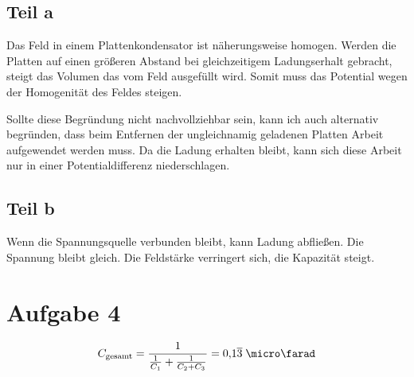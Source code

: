 \documentclass[a4paper,german,12pt,smallheadings]{scrartcl}
\begin{document}
\subsection*{Teil a}
Das Feld in einem Plattenkondensator ist näherungsweise homogen. Werden die
Platten auf einen größeren Abstand bei gleichzeitigem Ladungserhalt gebracht,
steigt das Volumen das vom Feld ausgefüllt wird. Somit muss das Potential wegen
der Homogenität des Feldes steigen.

Sollte diese Begründung nicht nachvollziehbar sein, kann ich auch alternativ
begründen, dass beim Entfernen der ungleichnamig geladenen Platten Arbeit
aufgewendet werden muss. Da die Ladung erhalten bleibt, kann sich diese Arbeit
nur in einer Potentialdifferenz niederschlagen.

\subsection*{Teil b}
Wenn die Spannungsquelle verbunden bleibt, kann Ladung abfließen. Die Spannung
bleibt gleich. Die Feldstärke verringert sich, die Kapazität steigt.


\section*{Aufgabe 4}

\begin{align*}
  C_{\operatorname{gesamt}} = \frac{1}{\frac{1}{C_1} + \frac{1}{C_2 + C_3}} = 0{,}1\overline{3} \;\micro\farad
\end{align*}
\end{document}
